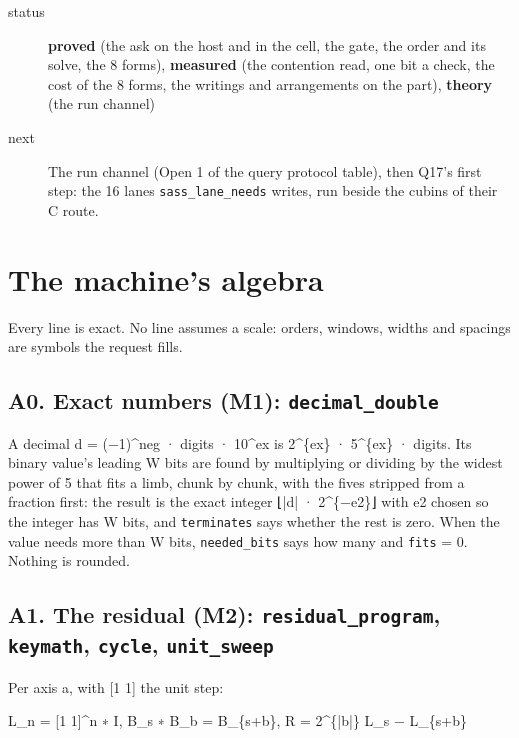 \begin{description}
\item[{status}] \textbf{proved} (the ask on the host and in the cell, the gate, the order and its solve, the 8 forms), \textbf{measured} (the contention read, one bit a check, the cost of the 8 forms, the writings and arrangements on the part), \textbf{theory} (the run channel)
\item[{next}] The run channel (Open 1 of the query protocol table), then Q17's first step: the 16 lanes \texttt{sass\_\allowbreak{}lane\_\allowbreak{}needs} writes, run beside the cubins of their C route.
\end{description}

\section{\texorpdfstring{The machine's algebra}{The machine's algebra}}

Every line is exact. No line assumes a scale: orders, windows, widths and spacings are symbols the request fills.

\subsection{\texorpdfstring{A0. Exact numbers (M1): \texttt{decimal\_\allowbreak{}double}}{A0. Exact numbers (M1): decimal\_double}}

A decimal d = (−1)\textasciicircum{}neg · digits · 10\textasciicircum{}ex is 2\textasciicircum{}\{ex\} · 5\textasciicircum{}\{ex\} · digits. Its binary value's leading W bits are found by multiplying or dividing by the widest power of 5 that fits a limb, chunk by chunk, with the fives stripped from a fraction first: the result is the exact integer ⌊|d| · 2\textasciicircum{}\{−e2\}⌋ with e2 chosen so the integer has W bits, and \texttt{terminates} says whether the rest is zero. When the value needs more than W bits, \texttt{needed\_\allowbreak{}bits} says how many and \texttt{fits} = 0. Nothing is rounded.

\subsection{\texorpdfstring{A1. The residual (M2): \texttt{residual\_\allowbreak{}program}, \texttt{keymath}, \texttt{cycle}, \texttt{unit\_\allowbreak{}sweep}}{A1. The residual (M2): residual\_program, keymath, cycle, unit\_sweep}}

Per axis a, with [1 1] the unit step:

L\_\allowbreak{}n = [1 1]\textasciicircum{}n ∗ I,  B\_\allowbreak{}s ∗ B\_\allowbreak{}b = B\_\allowbreak{}\{s+b\},  R = 2\textasciicircum{}\{|b|\} L\_\allowbreak{}s − L\_\allowbreak{}\{s+b\}

